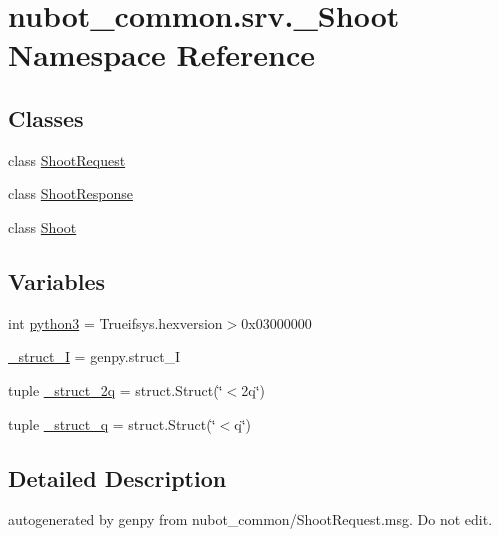 \hypertarget{namespacenubot__common_1_1srv_1_1__Shoot}{\section{nubot\-\_\-common.\-srv.\-\_\-\-Shoot Namespace Reference}
\label{namespacenubot__common_1_1srv_1_1__Shoot}
}
\subsection*{Classes}
\begin{DoxyCompactItemize}
\item 
class \hyperlink{classnubot__common_1_1srv_1_1__Shoot_1_1ShootRequest}{Shoot\-Request}
\item 
class \hyperlink{classnubot__common_1_1srv_1_1__Shoot_1_1ShootResponse}{Shoot\-Response}
\item 
class \hyperlink{classnubot__common_1_1srv_1_1__Shoot_1_1Shoot}{Shoot}
\end{DoxyCompactItemize}
\subsection*{Variables}
\begin{DoxyCompactItemize}
\item 
int \hyperlink{namespacenubot__common_1_1srv_1_1__Shoot_a344b19f8d7fbcaefc496a25053316360}{python3} = Trueifsys.\-hexversion$>$0x03000000
\item 
\hyperlink{namespacenubot__common_1_1srv_1_1__Shoot_a9c5865df70832f1d7ba597991610b22a}{\-\_\-struct\-\_\-\-I} = genpy.\-struct\-\_\-\-I
\item 
tuple \hyperlink{namespacenubot__common_1_1srv_1_1__Shoot_a0e554cd32733a7381460d65aba94d4ce}{\-\_\-struct\-\_\-2q} = struct.\-Struct(\char`\"{}$<$2q\char`\"{})
\item 
tuple \hyperlink{namespacenubot__common_1_1srv_1_1__Shoot_ab9ca5ae6841b4905cc57179787e9b6e6}{\-\_\-struct\-\_\-q} = struct.\-Struct(\char`\"{}$<$q\char`\"{})
\end{DoxyCompactItemize}


\subsection{Detailed Description}
\begin{DoxyVerb}autogenerated by genpy from nubot_common/ShootRequest.msg. Do not edit.\end{DoxyVerb}
 

